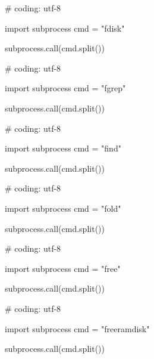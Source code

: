 \begin{mylisting}[label={lst:acpid},language=sh,caption=fdisk]

# coding: utf-8

import subprocess
cmd = "fdisk"

subprocess.call(cmd.split())

\end{mylisting}

\begin{mylisting}[label={lst:acpid},language=sh,caption=fgrep]

# coding: utf-8

import subprocess
cmd = "fgrep"

subprocess.call(cmd.split())

\end{mylisting}

\begin{mylisting}[label={lst:acpid},language=sh,caption=find]

# coding: utf-8

import subprocess
cmd = "find"

subprocess.call(cmd.split())

\end{mylisting}

\begin{mylisting}[label={lst:acpid},language=sh,caption=fold]

# coding: utf-8

import subprocess
cmd = "fold"

subprocess.call(cmd.split())

\end{mylisting}

\begin{mylisting}[label={lst:acpid},language=sh,caption=free]

# coding: utf-8

import subprocess
cmd = "free"

subprocess.call(cmd.split())

\end{mylisting}

\begin{mylisting}[label={lst:acpid},language=sh,caption=freeramdisk]

# coding: utf-8

import subprocess
cmd = "freeramdisk"

subprocess.call(cmd.split())

\end{mylisting}

